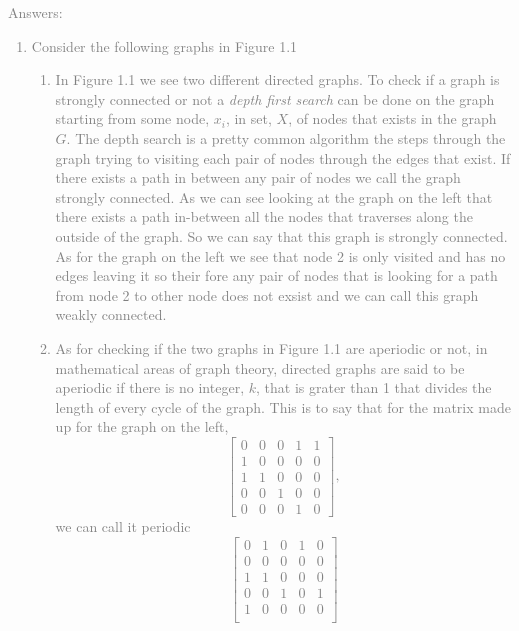 \documentclass[11pt]{article}
\begin{document}
\textcolor{gray}{
Answers:
\begin{enumerate}
	\item Consider the following graphs in Figure 1.1
	\begin{enumerate}[a]
		\item In Figure 1.1 we see two different directed graphs.  To check if a graph is strongly connected or not a \textit{depth first search} can be done on the graph starting from some node, $x_i$, in set, $X$, of nodes that exists in the graph $G$.  The depth search is a pretty common algorithm the steps through the graph trying to visiting each pair of nodes through the edges that exist. If there exists a path in between any pair of nodes we call the graph strongly connected.  As we can see looking at the graph on the left that there exists a path in-between all the nodes that traverses along the outside of the graph. So we can say that this graph is strongly connected.  As for the graph on the left we see that node 2 is only visited and has no edges leaving it so their fore any pair of nodes that is looking for a path from node 2 to other node does not exsist and we can call this graph weakly connected. 
		\item As for checking if the two graphs in Figure 1.1 are aperiodic or not, in mathematical areas of graph theory, directed graphs are said to be aperiodic if there is no integer, $k$, that is grater than 1 that divides the length of every cycle of the graph.  This is to say that for the matrix made up for the graph on the left,
		$$\begin{bmatrix} 
			0 & 0 & 0 & 1 & 1 \\
			1 & 0 & 0 & 0 & 0 \\
			1 & 1 & 0 & 0 & 0 \\
			0 & 0 & 1 & 0 & 0 \\
			0 & 0 & 0 & 1 & 0
		\end{bmatrix},$$
we can call it periodic 
		$$\begin{bmatrix} 
			0 & 1 & 0 & 1 & 0 \\
			0 & 0 & 0 & 0 & 0 \\
			1 & 1 & 0 & 0 & 0 \\
			0 & 0 & 1 & 0 & 1 \\
			1 & 0 & 0 & 0 & 0 \\
		\end{bmatrix}$$
	\end{enumerate}
\end{enumerate}
}
\end{document}
